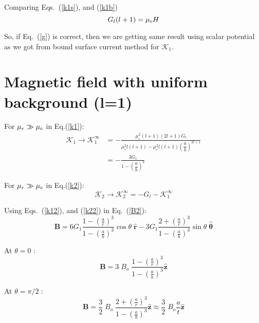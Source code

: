 Comparing Eqs.~(\ref{k1s}), and (\ref{k1b})
\begin{equation}\label{g}
G_l(l+1)=\mu_{\scriptscriptstyle 0} H
\end{equation}

So, if Eq.~(\ref{g}) is correct, then we are getting same result using scalar potential as we got from bound surface current method for $\mathcal{K}_1$.

\section{Magnetic field with uniform background (l=1)}

For \(\mu_r\gg\mu_{\scriptscriptstyle 0}\) in Eq.(\ref{k1}):
\begin{equation}\label{k12}
\begin{split}
\mathcal{K}_1\rightarrow\mathcal{K}_1^\infty & =-\frac{\mu_r^2(l+1) (2l+1)G_l}{\mu_r^2 l(l+1)-\mu_r^2 l(l+1)\left(\dfrac{a}{b}\right)^{2l+1}}\\
& =-\frac{3 G_1}{1-\left(\dfrac{a}{b}\right)^{3}}
\end{split}
\end{equation}

For \(\mu_r\gg\mu_{\scriptscriptstyle 0}\) in Eq.(\ref{k2}):
\begin{equation}\label{k22}
\mathcal{K}_2\rightarrow\mathcal{K}_2^\infty=-G_l-\mathcal{K}_1^\infty
\end{equation}

Using Eqs.~(\ref{k12}), and (\ref{k22}) in Eq.~(\ref{B2}):
\begin{equation}
    \bm{B}=6 G_1\frac{1-\left(\frac{a}{r}\right)^3}{1-\left(\frac{a}{b}\right)^3}\cos\theta\;\bm{\hat{r}}-3 G_1\frac{2+\left(\frac{a}{r}\right)^3}{1-\left(\frac{a}{b}\right)^3}\sin\theta\;\bm{\hat{\theta}}
\end{equation}

At $\theta=0$ :
\begin{equation}
    \bm{B}=3\;B_o\;\frac{1-\left(\frac{a}{r}\right)^3}{1-\left(\frac{a}{b}\right)^3}\bm{\hat{z}}
\end{equation}

At $\theta=\pi/2$ :
\begin{equation}
    \bm{B}=\frac{3}{2}\;B_o\;\frac{2+\left(\frac{a}{r}\right)^3}{1-\left(\frac{a}{b}\right)^3}\bm{\hat{z}}\approx \frac{3}{2}\;B_o\frac{a}{t}\bm{\hat{z}}
\end{equation}

